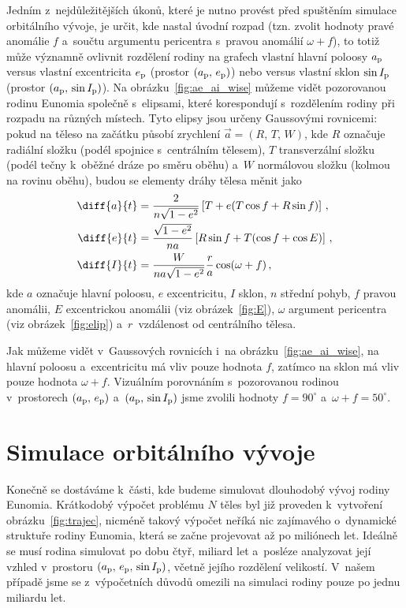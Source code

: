 \documentclass[A4paper, 12pt, oneside, openany]{book}
\begin{document}
Jedním z~nejdůležitějších úkonů, které je nutno provést před spuštěním simulace orbitálního vývoje, je určit, kde nastal úvodní rozpad (tzn. zvolit hodnoty pravé anomálie $f$ a~součtu argumentu pericentra s~pravou anomálií $\omega+f$), to totiž může významně ovlivnit rozdělení rodiny na grafech vlastní hlavní poloosy $a_{\rm p}$ versus vlastní excentricita $e_{\rm p}$ (prostor $(a_{\rm p},\,e_{\rm p})$) nebo versus vlastní sklon $\sin I_{\rm p}$ (prostor $(a_{\rm p},\,\sin I_{\rm p})$). Na obrázku~\ref{fig:ae_ai_wise} můžeme vidět pozorovanou rodinu Eunomia společně s~elipsami, které korespondují s~rozdělením rodiny při rozpadu na různých místech. Tyto elipsy jsou určeny Gaussovými rovnicemi: pokud na těleso na začátku působí zrychlení $\vec{a}=(R,\,T,\,W)$, kde $R$ označuje radiální složku (podél spojnice s~centrálním tělesem), $T$ transverzální složku (podél tečny k~oběžné dráze po směru oběhu) a~$W$ normálovou složku (kolmou na rovinu oběhu), budou se elementy dráhy tělesa měnit jako~\cite{fmt}
\begin{align}
	\diff{a}{t}&=\frac{2}{n\sqrt{1-e^2}}\left[T+e(T\cos f+R\sin f)\right] \,, \\
	\diff{e}{t}&=\frac{\sqrt{1-e^2}}{na}\left[R\sin f+T(\cos f+\cos E)\right]\,, \\
	\diff{I}{t}&=\frac{W}{na\sqrt{1-e^2}}\frac{r}{a}\cos(\omega+f)\,,
\end{align}
kde $a$ označuje hlavní poloosu, $e$ excentricitu, $I$ sklon, $n$ střední pohyb, $f$ pravou anomálii, $E$ excentrickou anomálii (viz obrázek~\ref{fig:E}), $\omega$ argument pericentra (viz obrázek~\ref{fig:elip}) a~$r$~vzdálenost od centrálního tělesa.

Jak můžeme vidět v~Gaussových rovnicích i~na obrázku~\ref{fig:ae_ai_wise}, na hlavní poloosu a~excentricitu má vliv pouze hodnota $f$, zatímco na sklon má vliv pouze hodnota $\omega+f$. Vizuálním porovnáním s~pozorovanou rodinou v~prostorech $(a_{\rm p},\,e_{\rm p})$ a~$(a_{\rm p},\,\sin I_{\rm p})$ jsme zvolili hodnoty $f=90^\circ$ a~$\omega+f=50^\circ$.

\newpage
\section{Simulace orbitálního vývoje}

Konečně se dostáváme k~části, kde budeme simulovat dlouhodobý vývoj rodiny Eunomia. Krátkodobý výpočet problému $N$ těles byl již proveden k~vytvoření obrázku~\ref{fig:trajec}, nicméně takový výpočet neříká nic zajímavého o~dynamické struktuře rodiny Eunomia, která se začne projevovat až po miliónech let. Ideálně se musí rodina simulovat po dobu čtyř, miliard let a~posléze analyzovat její vzhled v~prostoru $(a_{\rm p},\,e_{\rm p},\,\sin I_{\rm p})$, včetně jejího rozdělení velikostí. V~našem případě jsme se z~výpočetních důvodů omezili na simulaci rodiny pouze po jednu miliardu let.
\end{document}
